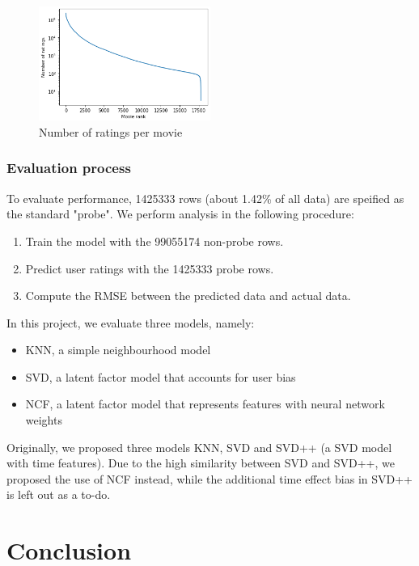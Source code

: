 \documentclass[final]{cvpr}
\begin{document}
\begin{figure}
	\includegraphics[width=0.5\textwidth]{screenshot20210422223229.png}
	\caption{Number of ratings per movie}
	\label{fig:movie-rating-freq}
\end{figure}

\subsubsection{Evaluation process}
To evaluate performance, 1425333 rows (about 1.42\% of all data) are speified as the standard "probe".
We perform analysis in the following procedure:

\begin{enumerate}
	\item Train the model with the 99055174 non-probe rows.
	\item Predict user ratings with the 1425333 probe rows.
	\item Compute the \ac{RMSE} between the predicted data and actual data.
\end{enumerate}

In this project, we evaluate three models, namely:

\begin{itemize}
	\item \ac{KNN}, a simple neighbourhood model
	\item \ac{SVD}, a latent factor model that accounts for user bias
	\item \ac{NCF}, a latent factor model that represents features with neural network weights
\end{itemize}

Originally, we proposed three models KNN, SVD and SVD++ (a SVD model with time features).
Due to the high similarity between SVD and SVD++,
we proposed the use of NCF instead,
while the additional time effect bias in SVD++ is left out as a to-do.

\section{Conclusion}
\end{document}
